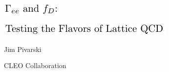 \documentclass[landscape]{article}
\newenvironment{slide}[1][ ]{\mbox{\bf \boldmath #1 } \vfill}{\vfill \vspace{-1.5 cm} \mbox{ } \pagebreak}
\begin{document}
\Huge \sffamily
\renewcommand{\labelitemi}{{\huge $\stackrel{\bullet}{\mbox{ }}$}}
\setlength{\parindent}{0 cm}

\begin{slide}

\begin{center}
\includegraphics[height=1.5 cm]{title}

\vspace{0.3 cm}
\includegraphics[height=1.5 cm]{title2}

\vspace{1 cm}
Jim Pivarski

\vspace{1 cm}
CLEO Collaboration
\end{center}

\end{slide}
\end{document}
